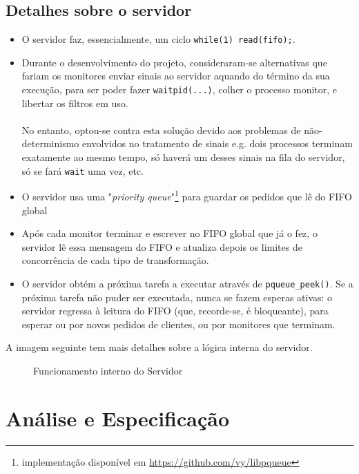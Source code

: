 \documentclass[11pt,a4paper]{report}%
\begin{document}
\section{Detalhes sobre o servidor}
\begin{itemize}
  \item O servidor faz, essencialmente, um ciclo \lstinline{while(1) read(fifo);}.
  \item Durante o desenvolvimento do projeto, consideraram-se alternativas que fariam os monitores enviar
  sinais ao servidor aquando do término da sua execução, para ser poder fazer \lstinline{waitpid(...)}, colher
  o processo monitor, e libertar os filtros em uso.\\
  \\
  No entanto, optou-se contra esta solução devido aos problemas de não-determinismo envolvidos no tratamento de sinais
  e.g. dois processos terminam exatamente ao mesmo tempo, só haverá um desses sinais na fila do servidor, só se fará
  \lstinline{wait} uma vez, etc.
  \item O servidor usa uma "\textit{priority queue}"\footnote{implementação disponível em \url{https://github.com/vy/libpqueue}}
  para guardar os pedidos que lê do FIFO global
  \item Após cada monitor terminar e escrever no FIFO global que já o fez, o servidor lê essa mensagem do FIFO
  e atualiza depois os limites de concorrência de cada tipo de transformação.
  \item O servidor obtém a próxima tarefa a executar através de \lstinline{pqueue_peek()}. Se a próxima tarefa
  não puder ser executada, nunca se fazem esperas ativas: o servidor regressa à leitura do FIFO
  (que, recorde-se, é bloqueante), para esperar ou por novos pedidos de clientes, ou por monitores que terminam.
\end{itemize}

A imagem seguinte tem mais detalhes sobre a lógica interna do servidor.

\newpage

\begin{figure}[H]
  \centering
  
  \caption{Funcionamento interno do Servidor}
\end{figure}


\chapter{Análise e Especificação} \label{chap:analiseEspecificacao} %
\end{document}
